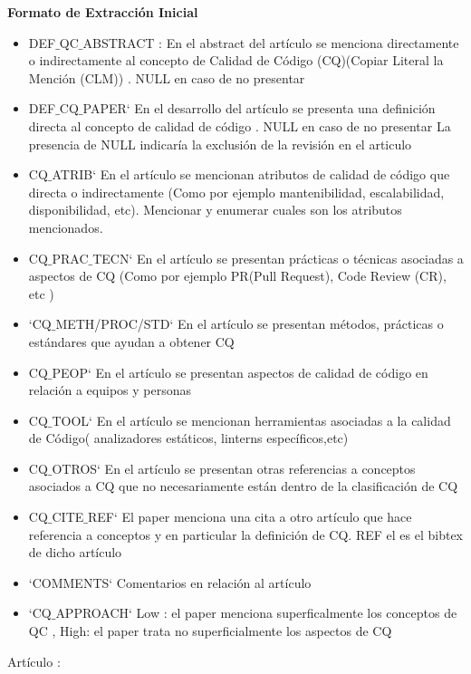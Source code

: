 \documentclass[conference]{IEEEtran}
\begin{document}
\textbf{Formato de Extracción Inicial }
\begin{itemize}
\item DEF$\_$QC$\_$ABSTRACT : En el abstract del artículo se menciona directamente o indirectamente al concepto de Calidad de Código (CQ)(Copiar Literal la Mención (CLM)) . NULL en caso de no presentar
\item DEF$\_$CQ$\_$PAPER`	En el desarrollo del artículo se presenta una definición directa al concepto de calidad de código . NULL en caso de no presentar	La presencia de NULL indicaría la exclusión de la revisión en el articulo
\item CQ$\_$ATRIB`	En el artículo se mencionan atributos de calidad de código que directa o indirectamente (Como por ejemplo mantenibilidad, escalabilidad, disponibilidad, etc). Mencionar y enumerar cuales son los atributos mencionados.
\item CQ$\_$PRAC$\_$TECN`	En el artículo se presentan prácticas o técnicas asociadas a aspectos de CQ (Como por ejemplo PR(Pull Request), Code Review (CR), etc )	
\item `CQ$\_$METH/PROC/STD`	En el artículo se presentan métodos, prácticas o estándares que ayudan a obtener CQ
\item CQ$\_$PEOP`	En el artículo se presentan aspectos de calidad de código en relación a equipos y personas
\item CQ$\_$TOOL`	En el artículo se mencionan herramientas asociadas a la calidad de Código( analizadores estáticos, linterns específicos,etc)
\item CQ$\_$OTROS`	En el artículo se presentan otras referencias a conceptos asociados a CQ que no necesariamente están dentro de la clasificación de CQ
\item CQ$\_$CITE$\_$REF`	El paper menciona una cita a otro artículo que hace referencia a conceptos y en particular la definición de CQ.  REF el es el bibtex de dicho artículo
\item `COMMENTS`	Comentarios en relación al artículo	
\item `CQ$\_$APPROACH`	Low : el paper menciona superficalmente los conceptos de QC , High: el paper trata no superficialmente los aspectos de CQ
\end{itemize}


Artículo : %
\end{document}
